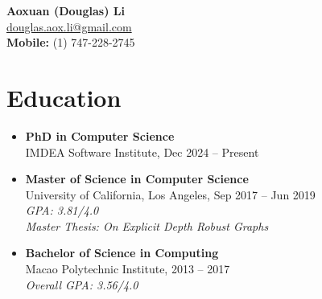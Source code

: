 \documentclass[a4paper,12pt]{article}
\begin{document}


\begin{center}
    \textbf{\huge Aoxuan (Douglas) Li} \\
    \vspace{0.5em}
    \small \href{mailto:douglas.aox.li@gmail.com}{douglas.aox.li@gmail.com} \\
    \small \textbf{Mobile:} (1) 747-228-2745
\end{center}

\vspace{1em}

\section*{Education}
\begin{itemize}[left=0pt, label={}]
    \item \textbf{PhD in Computer Science} \\
    IMDEA Software Institute, Dec 2024 – Present
    \item \textbf{Master of Science in Computer Science} \\
    University of California, Los Angeles, Sep 2017 – Jun 2019 \\
    \emph{GPA: 3.81/4.0} \\
    \textit{Master Thesis: On Explicit Depth Robust Graphs}
    \item \textbf{Bachelor of Science in Computing} \\
    Macao Polytechnic Institute, 2013 – 2017 \\
    \emph{Overall GPA: 3.56/4.0}
\end{itemize}
\end{document}
